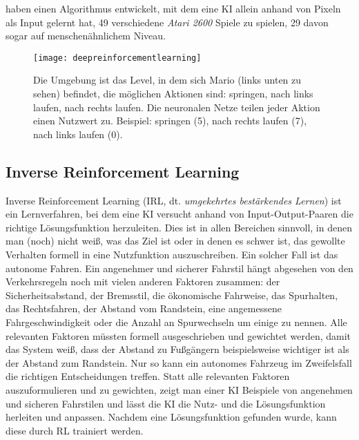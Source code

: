 \citeauthor{mnih_human-level_2015} haben einen Algorithmus entwickelt, mit dem eine KI allein anhand von Pixeln als Input gelernt hat, 49 verschiedene \emph{Atari 2600} Spiele zu spielen, 29 davon sogar auf menschenähnlichem Niveau. 



\begin{figure}
  \texttt{[image: deepreinforcementlearning]}
  \caption{Die Umgebung ist das Level, in dem sich Mario (links unten zu sehen) befindet, die möglichen Aktionen sind: springen, nach links laufen, nach rechts laufen. Die neuronalen Netze teilen jeder Aktion einen Nutzwert zu. Beispiel: springen (5), nach rechts laufen (7), nach links laufen (0). }
  \label{deepreinforcementlearningimg}
\end{figure}

\subsection{Inverse Reinforcement Learning}
Inverse Reinforcement Learning (IRL, dt. \emph{umgekehrtes bestärkendes Lernen}) ist ein Lernverfahren, bei dem eine KI versucht anhand von Input-Output-Paaren die richtige Lösungsfunktion herzuleiten. Dies ist in allen Bereichen sinnvoll, in denen man (noch) nicht weiß, was das Ziel ist oder in denen es schwer ist, das gewollte Verhalten formell in eine Nutzfunktion auszuschreiben. Ein solcher Fall ist das autonome Fahren. Ein angenehmer und sicherer Fahrstil hängt abgesehen von den Verkehrsregeln noch mit vielen anderen Faktoren zusammen: der Sicherheitsabstand, der Bremsstil, die ökonomische Fahrweise, das Spurhalten, das Rechtsfahren, der Abstand vom Randstein, eine angemessene Fahrgeschwindigkeit oder die Anzahl an Spurwechseln um einige zu nennen. Alle relevanten Faktoren müssten formell ausgeschrieben und gewichtet werden, damit das System weiß, dass der Abstand zu Fußgängern beispielsweise wichtiger ist als der Abstand zum Randstein. Nur so kann ein autonomes Fahrzeug im Zweifelsfall die richtigen Entscheidungen treffen. Statt alle relevanten Faktoren auszuformulieren und zu gewichten, zeigt man einer KI Beispiele von angenehmen und sicheren Fahrstilen und lässt die KI die Nutz- und die Lösungsfunktion herleiten und anpassen.  Nachdem eine Lösungsfunktion gefunden wurde, kann diese durch RL trainiert werden. 


